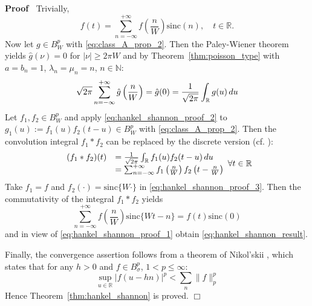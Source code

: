 \documentclass{article}
\newcommand{\assign}{:=}
\newcommand{\cdummy}{\cdot}
\newenvironment{proof}{\noindent\textbf{Proof\ }}{\hspace*{\fill}$\Box$\medskip}
\begin{document}
\begin{proof}
  Trivially,
  \begin{equation}
    f (t) = \sum_{n = - \infty}^{+ \infty} f \left( \frac{n}{W} \right)
    \mathrm{sinc} (n), \quad t \in \mathbb{R}.
    \label{eq:hankel_shannon_proof_1}
  \end{equation}
  Now let $g \in B_W^p$ with \eqref{eq:class_A_prop_2}. Then the Paley-Wiener
  theorem yields $\hat{g} (\nu) = 0$ for $| \nu | \geq 2 \pi W$ and by
  Theorem~\ref{thm:poisson_type} with $a = b_n = 1$, $\lambda_n = \mu_n = n$,
  $n \in \mathbb{N}$:
  \begin{equation}
    \sqrt{2 \pi}  \sum_{n = - \infty}^{+ \infty} \hat{g} \left( \frac{n}{W}
    \right) = \hat{g} (0) = \frac{1}{\sqrt{2 \pi}}  \int_{\mathbb{R}} g (u) 
    \hspace{0.17em} du \label{eq:hankel_shannon_proof_2}
  \end{equation}
  Let $f_1, f_2 \in B_W^p$ and apply \eqref{eq:hankel_shannon_proof_2} to $g_1
  (u) \assign f_1 (u) f_2  (t - u) \in B_W^p$ with \eqref{eq:class_A_prop_2}.
  Then the convolution integral $f_1 \ast f_2$ can be replaced by the discrete
  version (cf. {\cite{8}}):
  \begin{equation}
    \begin{array}{ll}
      (f_1 \ast f_2) (t) & = \frac{1}{\sqrt{2 \pi}}  \int_{\mathbb{R}} f_1 (u)
      f_2  (t - u)  \hspace{0.17em} du\\
      & = \sum_{n = - \infty}^{+ \infty} f_1 \left( \frac{n}{W} \right) f_2 
      \left( t - \frac{n}{W} \right)
    \end{array} \label{eq:hankel_shannon_proof_3} \forall t \in \mathbb{R}
  \end{equation}
  Take $f_1 = f$ and $f_2 (\cdummy) = \mathrm{sinc} \{W \cdot\}$ in
  \eqref{eq:hankel_shannon_proof_3}. Then the commutativity of the integral
  $f_1 \ast f_2$ yields
  \begin{equation}
    \sum_{n = - \infty}^{+ \infty} f \left( \frac{n}{W} \right) \mathrm{sinc}
    \{Wt - n\} = f (t) \mathrm{sinc} (0) \label{eq:hankel_shannon_proof_4}
  \end{equation}
  and in view of \eqref{eq:hankel_shannon_proof_1} obtain
  \eqref{eq:hankel_shannon_result}.
  
  Finally, the convergence assertion follows from a theorem of Nikol'skii
  {\cite{25}}, which states that for any $h > 0$ and $f \in B_{\sigma}^p$, $1
  < p \leq \infty$:
  \begin{equation}
    \sup_{u \in \mathbb{R}} |f (u - hn) |^p < \sum_n \|f\|_p^p
    \label{eq:nikol_skii}
  \end{equation}
  Hence Theorem~\ref{thm:hankel_shannon} is proved.
\end{proof}
\end{document}
